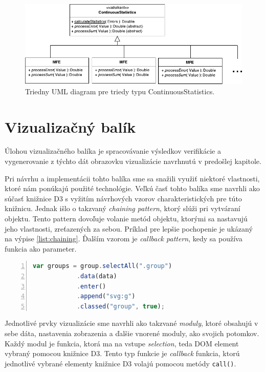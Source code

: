  \pagebreak 
             
\begin{figure}
	\centering
	\includegraphics[width = 5in]{stats}
	\caption{Triedny UML diagram pre triedy typu ContinuousStatistics.}
	\label{fig:stats} 
\end{figure}

\section{Vizualizačný balík}
Úlohou vizualizačného balíka je spracovávanie výsledkov verifikácie a vygenerovanie z týchto dát obrazovku vizualizácie navrhnutú v predošlej kapitole. 

Pri návrhu a implementácii tohto balíka sme sa snažili využiť niektoré vlastnosti, ktoré nám ponúkajú použité technológie. Veľkú časť tohto balíka sme navrhli ako súčasť knižnice D3 s vyžitím návrhových vzorov charakteristických pre túto knižnicu. Jednak išlo o takzvaný \textit{chaining pattern}, ktorý slúži pri vytváraní objektu. Tento pattern dovoľuje volanie metód objektu, ktorými sa nastavujú jeho vlastnosti, zreťazených za sebou. Príklad pre lepšie pochopenie je ukázaný na výpise \ref{list:chaining}.
Ďalším vzorom je \textit{callback pattern}, kedy sa používa funkcia ako parameter. 


\begin{lstlisting}[frame=solid, backgroundcolor=\color{bg}, basicstyle=\footnotesize\ttfamily, language=JavaScript, numbers=left, numberstyle=\tiny\color{black}, caption=Ukážka aplikácie návrhového vzoru \textit{chainning}., captionpos=b, label=list:chaining]
var groups = group.selectAll(".group")
		    .data(data)
		    .enter()
		    .append("svg:g")
		    .classed("group", true);	
\end{lstlisting}

Jednotlivé prvky vizualizácie sme navrhli ako takzvané \textit{moduly}, ktoré obsahujú v sebe dáta, nastavenia zobrazenia a ďalšie vnorené moduly, ako svojich potomkov. Každý modul je funkcia, ktorá ma na vstupe \textit{selection}, teda DOM element vybraný pomocou knižnice D3. Tento typ funkcie je \textit{callback} funkcia, ktorú jednotlivé vybrané elementy knižnice D3 volajú pomocou metódy \texttt{call()}. 

